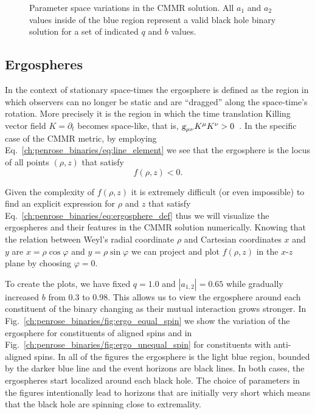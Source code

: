 \begin{figure}
{    \label{ch:penrose_binaries/fig:par_reg_i}
  }
  \caption{Parameter space variations in the CMMR solution. All $a_1$ and $a_2$ values inside of the blue region represent a valid black hole binary solution for a set of indicated $q$ and $b$ values.}
  \label{ch:penrose_binaries/fig:parameter_space}
\end{figure}

\subsection{Ergospheres}

In the context of stationary space-times the ergosphere is defined as the region in which observers can no longer be static and are ``dragged'' along the space-time's rotation. More precisely it is the region in which the time translation Killing vector field $K = \partial_t$ becomes space-like, that is, $\mtrtens{\mu}{\nu}\tens{K}{\mu}{}\tens{K}{\nu}{} >0$~\cite{CARROLL}. In the specific case of the CMMR metric, by employing Eq.~\eqref{ch:penrose_binaries/eq:line_element} we see that the ergosphere is the locus of all points $(\rho,z)$ that satisfy
%
\begin{equation}
  f(\rho,z) < 0.
  \label{ch:penrose_binaries/eq:ergosphere_def}
\end{equation}

Given the complexity of $f(\rho,z)$ it is extremely difficult (or even impossible) to find an explicit expression for $\rho$ and $z$ that satisfy Eq.~\eqref{ch:penrose_binaries/eq:ergosphere_def} thus we will visualize the ergospheres and their features in the CMMR solution numerically. Knowing that the relation between Weyl's radial coordinate $\rho$ and Cartesian coordinates $x$ and $y$ are $x = \rho\cos\varphi$ and $y = \rho\sin\varphi$ we can project and plot $f(\rho,z)$ in the $x$-$z$ plane by choosing $\varphi=0$.

To create the plots, we have fixed $q = 1.0$ and $|a_{1,2}| = 0.65$ while gradually increased $b$ from $0.3$ to $0.98$. This allows us to view the ergosphere around each constituent of the binary changing as their mutual interaction grows stronger. In Fig.~\ref{ch:penrose_binaries/fig:ergo_equal_spin} we show the variation of the ergosphere for constituents of aligned spins and in Fig.~\ref{ch:penrose_binaries/fig:ergo_unequal_spin} for constituents with anti-aligned spins. In all of the figures the ergosphere is the light blue region, bounded by the darker blue line and the event horizons are black lines. In both cases, the ergospheres start localized around each black hole. The choice of parameters in the figures intentionally lead to horizons that are initially very short which means that the black hole are spinning close to extremality.

